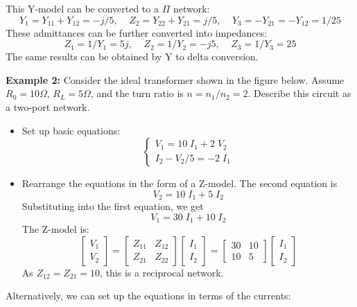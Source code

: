 \documentclass{article}
\begin{document}
This Y-model can be converted to a $\Pi$ network:
\begin{equation}
  Y_1=Y_{11}+Y_{12}=-j/5,\;\;\;\;Z_2=Y_{22}+Y_{21}=j/5,\;\;\;\;
  Y_3=-Y_{21}=-Y_{12}=1/25 
\end{equation}
These admittances can be further converted into impedances:
\begin{equation} 
  Z_1=1/Y_1=5j,\;\;\;\;Z_2=1/Y_2=-j5,\;\;\;\;Z_3=1/Y_3=25	
\end{equation}
The same results can be obtained by Y to delta conversion.


{\bf Example 2:} Consider the ideal transformer shown in the figure below. 
Assume $R_0=10\Omega$, $R_L=5\Omega$, and the turn ratio is $n=n_1/n_2=2$. 
Describe this circuit as a two-port network.


\begin{itemize}
\item Set up basic equations:
\begin{equation}	
  \left\{ \begin{array}{l} 
    V_1=10\;I_1+2\;V_2 \\ I_2-V_2/5=-2\;I_1 \end{array} \right. 
\end{equation}
\item Rearrange the equations in the form of a Z-model. The second equation is
\begin{equation}	
  V_2=10\;I_1+5\;I_2	
\end{equation}
Substituting into the first equation, we get
\begin{equation}
  V_1=30\;I_1+10\;I_2	
\end{equation}
The Z-model is:
\begin{equation}
  \left[ \begin{array}{l} V_1 \\ V_2 \end{array} \right]=
  \left[ \begin{array}{rr} Z_{11} & Z_{12} \\ Z_{21} & Z_{22} \end{array} \right]
  \left[ \begin{array}{l} I_1 \\ I_2 \end{array} \right]
  =	\left[ \begin{array}{rr} 30 & 10 \\ 10 & 5 \end{array} \right]
  \left[ \begin{array}{l} I_1 \\ I_2 \end{array} \right]
\end{equation}
As $Z_{12}=Z_{21}=10$, this is a reciprocal network.
\end{itemize}
Alternatively, we can set up the equations in terms of the currents:
\end{document}
